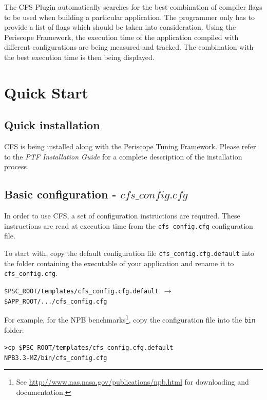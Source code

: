 \documentclass[11pt,a4paper, oneside]{book} %
\begin{document}
The CFS Plugin automatically searches for the best combination of compiler flags to be used when building a particular application. The programmer only has to provide a list of flags which should be taken into consideration. Using the Periscope Framework, the execution time of the application compiled with different configurations are being measured and tracked. The combination with the best execution time is then being displayed.



\chapter{Quick Start}
\section{Quick installation}
CFS is being installed along with the Periscope Tuning Framework. Please refer to the \textit{PTF Installation Guide} for a complete description of the installation process.

\section{Basic configuration - $cfs\_config.cfg$}

In order to use CFS, a set of configuration instructions are required. These instructions are read at execution time from the \texttt{cfs\_config.cfg} configuration file.

To start with, copy the default configuration file \texttt{cfs\_config.cfg.default} into the folder containing the executable of your application and rename it to \texttt{cfs\_config.cfg}.
\begin{center}
\begin{minipage}{0.8\textwidth}
\texttt{\$PSC\_ROOT/templates/cfs\_config.cfg.default $\rightarrow$ \$APP\_ROOT/.../cfs\_config.cfg}
\end{minipage}
\end{center}

For example, for the NPB benchmarks\footnote{See \url{http://www.nas.nasa.gov/publications/npb.html} for downloading and documentation.}, copy the configuration file into the \texttt{bin} folder:
\begin{center}
\begin{minipage}{0.8\textwidth}
    \texttt{>cp~\$PSC\_ROOT/templates/cfs\_config.cfg.default\\
     NPB3.3-MZ/bin/cfs\_config.cfg}
\end{minipage}
\end{center}
\end{document}
